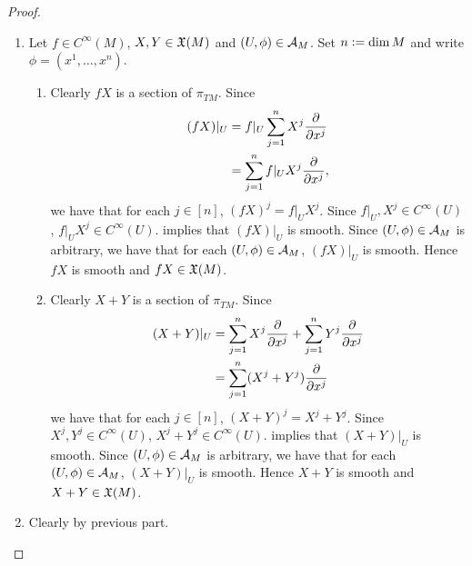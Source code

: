 \documentclass{book}
\begin{document}
\begin{proof}\
	\begin{enumerate}
		\item Let $f \in C^{\infty}(M)$, $X,Y \in \mathfrak{X}(M)$ and $(U, \phi) \in \mathcal{A}_M$. Set $n \vcentcolon= \dim M$ and write $\phi = (x^1, \ldots, x^n)$. 
		\begin{enumerate}
			\item Clearly $fX$ is a section of $\pi_{TM}$. Since
			\begin{align*}
				(fX)|_U 
				& = f|_U \sum\limits_{j=1}^n X^j \frac{\partial}{\partial x^j} \\
				& = \sum\limits_{j=1}^n f|_U X^j \frac{\partial}{\partial x^j}, 
			\end{align*} 
			we have that for each $j \in [n]$, $(fX)^j = f|_U X^j$. Since $f|_U, X^j \in C^{\infty}(U)$, $f|_U X^j \in C^{\infty}(U)$.  implies that $(fX)|_U$ is smooth. Since $(U, \phi) \in \mathcal{A}_M$ is arbitrary, we have that for each $(U, \phi) \in \mathcal{A}_M$, $(fX)|_U$ is smooth. Hence $fX$ is smooth and $fX \in \mathfrak{X}(M)$. 
			\item Clearly $X + Y$ is a section of $\pi_{TM}$. Since
			\begin{align*}
				(X+Y)|_U 
				& = \sum\limits_{j=1}^n X^j \frac{\partial}{\partial x^j} + \sum\limits_{j=1}^n Y^j \frac{\partial}{\partial x^j} \\
				& = \sum\limits_{j=1}^n (X^j + Y^j) \frac{\partial}{\partial x^j} 
			\end{align*} 
			we have that for each $j \in [n]$, $(X + Y)^j = X^j + Y^j$. Since $X^j,Y^j \in C^{\infty}(U)$, $X^j + Y^j \in C^{\infty}(U)$.  implies that $(X + Y)|_U$ is smooth. Since $(U, \phi) \in \mathcal{A}_M$ is arbitrary, we have that for each $(U, \phi) \in \mathcal{A}_M$, $(X + Y)|_U$ is smooth. Hence $X + Y$ is smooth and $X + Y \in \mathfrak{X}(M)$. 
		\end{enumerate}
		\item Clearly by previous part.
	\end{enumerate}
\end{proof}
\end{document}
